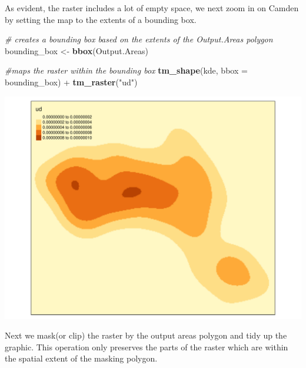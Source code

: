 \documentclass[]{article}
\newenvironment{Shaded}{}{}
\newcommand{\CommentTok}[1]{\textcolor[rgb]{0.38,0.63,0.69}{\textit{#1}}}
\newcommand{\DataTypeTok}[1]{\textcolor[rgb]{0.56,0.13,0.00}{#1}}
\newcommand{\KeywordTok}[1]{\textcolor[rgb]{0.00,0.44,0.13}{\textbf{#1}}}
\newcommand{\NormalTok}[1]{#1}
\newcommand{\OperatorTok}[1]{\textcolor[rgb]{0.40,0.40,0.40}{#1}}
\newcommand{\StringTok}[1]{\textcolor[rgb]{0.25,0.44,0.63}{#1}}
\begin{document}
As evident, the raster includes a lot of empty space, we next zoom in on
Camden by setting the map to the extents of a bounding box.

\begin{Shaded}
\begin{Highlighting}[]
\CommentTok{# creates a bounding box based on the extents of the Output.Areas polygon}
\NormalTok{bounding_box <-}\StringTok{ }\KeywordTok{bbox}\NormalTok{(Output.Areas)}

\CommentTok{#maps the raster within the bounding box}
\KeywordTok{tm_shape}\NormalTok{(kde, }\DataTypeTok{bbox =}\NormalTok{ bounding_box) }\OperatorTok{+}\StringTok{ }\KeywordTok{tm_raster}\NormalTok{(}\StringTok{"ud"}\NormalTok{)}
\end{Highlighting}
\end{Shaded}

\includegraphics{TutorialNotebook_files/figure-latex/unnamed-chunk-32-1.pdf}

Next we mask(or clip) the raster by the output areas polygon and tidy up
the graphic. This operation only preserves the parts of the raster which
are within the spatial extent of the masking polygon.
\end{document}
